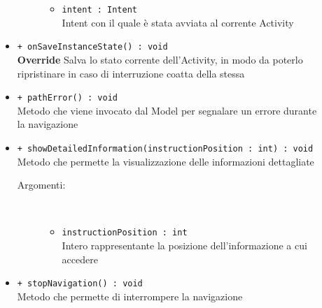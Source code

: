 \documentclass[../DefinizioneDiProdotto.tex]{subfiles}
\begin{document}
\begin{description}
\begin{itemize}
\begin{description}
\begin{itemize}
				\item \texttt{intent : Intent}\\
				Intent con il quale è stata avviata al corrente Activity\end{itemize}
		\end{description}
		\item \texttt{+ onSaveInstanceState() : void}\\
		\textbf{Override} Salva lo stato corrente dell'Activity, in modo da poterlo ripristinare in caso di interruzione coatta della stessa
		\item \texttt{+ pathError() : void}\\
		Metodo che viene invocato dal Model per segnalare un errore durante la navigazione
		\item \texttt{+ showDetailedInformation(instructionPosition : int) : void}\\
		Metodo che permette la visualizzazione delle informazioni dettagliate
		\begin{description}
			\item[Argomenti:] \
			\begin{itemize}
				\item \texttt{instructionPosition : int}\\
				Intero rappresentante la posizione dell'informazione a cui accedere\end{itemize}
		\end{description}
		\item \texttt{+ stopNavigation() : void}\\
		Metodo che permette di interrompere la navigazione
	\end{itemize}
\end{description}
\end{document}

